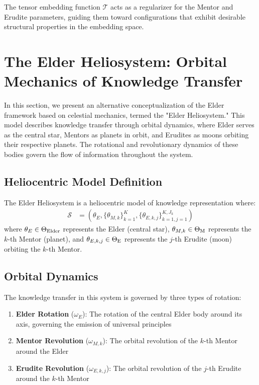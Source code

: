 \begin{corollary}
The tensor embedding function $\mathcal{T}$ acts as a regularizer for the Mentor and Erudite parameters, guiding them toward configurations that exhibit desirable structural properties in the embedding space.
\end{corollary}

\section{The Elder Heliosystem: Orbital Mechanics of Knowledge Transfer}

In this section, we present an alternative conceptualization of the Elder framework based on celestial mechanics, termed the "Elder Heliosystem." This model describes knowledge transfer through orbital dynamics, where Elder serves as the central star, Mentors as planets in orbit, and Erudites as moons orbiting their respective planets. The rotational and revolutionary dynamics of these bodies govern the flow of information throughout the system.

\subsection{Heliocentric Model Definition}

\begin{definition}
The Elder Heliosystem is a heliocentric model of knowledge representation where:
\begin{align}
\mathcal{S} &= (\theta_E, \{\theta_{M,k}\}_{k=1}^K, \{\theta_{E,k,j}\}_{k=1,j=1}^{K,J_k})
\end{align}
where $\theta_E \in \Theta_{\text{Elder}}$ represents the Elder (central star), $\theta_{M,k} \in \Theta_{\text{M}}$ represents the $k$-th Mentor (planet), and $\theta_{E,k,j} \in \Theta_{\text{E}}$ represents the $j$-th Erudite (moon) orbiting the $k$-th Mentor.
\end{definition}

\subsection{Orbital Dynamics}

The knowledge transfer in this system is governed by three types of rotation:

\begin{enumerate}
    \item \textbf{Elder Rotation} ($\omega_E$): The rotation of the central Elder body around its axis, governing the emission of universal principles
    \item \textbf{Mentor Revolution} ($\omega_{M,k}$): The orbital revolution of the $k$-th Mentor around the Elder
    \item \textbf{Erudite Revolution} ($\omega_{E,k,j}$): The orbital revolution of the $j$-th Erudite around the $k$-th Mentor
\end{enumerate}

